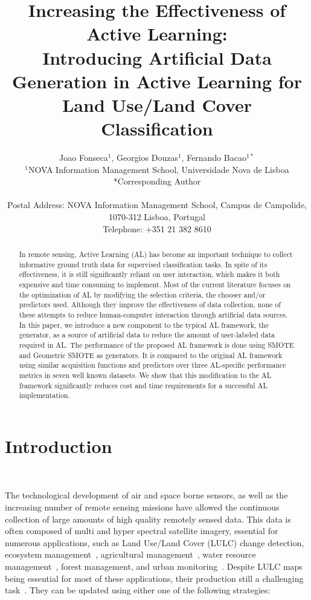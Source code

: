 \documentclass[parskip=full]{scrartcl}
\title{Increasing the Effectiveness of Active Learning:\\ 
	\LARGE{Introducing Artificial Data Generation in Active Learning for Land Use/Land Cover Classification}}
\author{
	Joao Fonseca\(^{1}\), Georgios Douzas\(^{1}\), Fernando Bacao\(^{1*}\) 
	\\
	\small{\(^{1}\)NOVA Information Management School, Universidade Nova de Lisboa}
	\\
	\small{*Corresponding Author}
	\\
	\\
	\small{Postal Address: NOVA Information Management School, Campus de Campolide, 1070-312 Lisboa, Portugal}
	\\
	\small{Telephone: +351 21 382 8610}
}
\date{}
\begin{document}
\maketitle

\begin{abstract}
    In remote sensing, Active Learning (AL) has become an important technique to
    collect informative ground truth data for supervised classification tasks.
    In spite of its effectiveness, it is still significantly reliant on user
    interaction, which makes it both expensive and time consuming to implement.
    Most of the current literature focuses on the optimization of AL by
    modifying the selection criteria, the chooser and/or predictors used.
    Although they improve the effectiveness of data collection, none of these
    attempts to reduce human-computer interaction through artificial data
    sources. In this paper, we introduce a new component to the typical AL
    framework, the generator, as a source of artificial data to reduce the
    amount of user-labeled data required in AL\@. The performance of the
    proposed AL framework is done using SMOTE and Geometric SMOTE as generators.
    It is compared to the original AL framework using similar acquisition
    functions and predictors over three AL-specific performance metrics in seven
    well known datasets. We show that this modification to the AL framework
    significantly reduces cost and time requirements for a successful AL
    implementation. 
\end{abstract}

\section{Introduction}~\label{sec:introduction}

The technological development of air and space borne sensors, as well as the
increasing number of remote sensing missions have allowed the continuous
collection of large amounts of high quality remotely sensed data. This data is
often composed of multi and hyper spectral satellite imagery, essential for
numerous applications, such as Land Use/Land Cover (LULC) change detection,
ecosystem management~\cite{Nagai2020}, agricultural management~\cite{Huang2018},
water resource management~\cite{Wang2018}, forest management, and urban
monitoring~\cite{Khatami2016}. Despite LULC maps being essential for most of
these applications, their production still a challenging task~\cite{Gavade2019,
Wulder2018}. They can be updated using either one of the following strategies:
\end{document}
